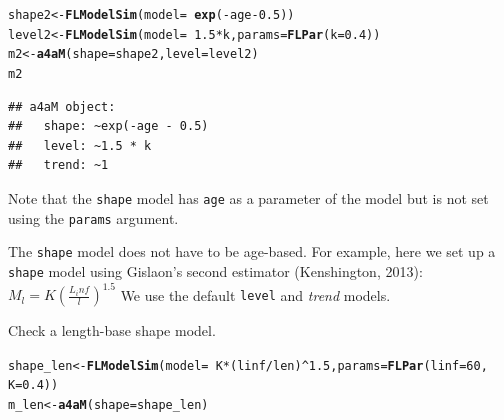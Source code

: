 \documentclass[a4paper,english,10pt]{article}\usepackage[]{graphicx}\usepackage[]{color}
\makeatletter
\newcommand{\hlnum}[1]{\textcolor[rgb]{0.686,0.059,0.569}{#1}}%
\newcommand{\hlopt}[1]{\textcolor[rgb]{0,0,0}{#1}}%
\newcommand{\hlstd}[1]{\textcolor[rgb]{0.345,0.345,0.345}{#1}}%
\newcommand{\hlkwb}[1]{\textcolor[rgb]{0.69,0.353,0.396}{#1}}%
\newcommand{\hlkwc}[1]{\textcolor[rgb]{0.333,0.667,0.333}{#1}}%
\newcommand{\hlkwd}[1]{\textcolor[rgb]{0.737,0.353,0.396}{\textbf{#1}}}%
\newenvironment{kframe}{%
 \def\at@end@of@kframe{}%
 \ifinner\ifhmode%
  \def\at@end@of@kframe{\end{minipage}}%
  \begin{minipage}{\columnwidth}%
 \fi\fi%
 \def\FrameCommand##1{\hskip\@totalleftmargin \hskip-\fboxsep
 \colorbox{shadecolor}{##1}\hskip-\fboxsep
     \hskip-\linewidth \hskip-\@totalleftmargin \hskip\columnwidth}%
 \MakeFramed {\advance\hsize-\width
   \@totalleftmargin\z@ \linewidth\hsize
   \@setminipage}}%
 {\par\unskip\endMakeFramed%
 \at@end@of@kframe}
\newenvironment{knitrout}{}{} %
\newcommand{\code}[1]{{\texttt{#1}}}
\newcommand{\class}[1]{{\textit{#1}}}
\makeatother
\begin{document}
\begin{knitrout}
\color{fgcolor}\begin{kframe}
\begin{alltt}
\hlstd{shape2} \hlkwb{<-} \hlkwd{FLModelSim}\hlstd{(}\hlkwc{model} \hlstd{=} \hlopt{~}\hlkwd{exp}\hlstd{(}\hlopt{-}\hlstd{age} \hlopt{-} \hlnum{0.5}\hlstd{))}
\hlstd{level2} \hlkwb{<-} \hlkwd{FLModelSim}\hlstd{(}\hlkwc{model} \hlstd{=} \hlopt{~}\hlnum{1.5} \hlopt{*} \hlstd{k,} \hlkwc{params} \hlstd{=} \hlkwd{FLPar}\hlstd{(}\hlkwc{k} \hlstd{=} \hlnum{0.4}\hlstd{))}
\hlstd{m2} \hlkwb{<-} \hlkwd{a4aM}\hlstd{(}\hlkwc{shape} \hlstd{= shape2,} \hlkwc{level} \hlstd{= level2)}
\hlstd{m2}
\end{alltt}
\begin{verbatim}
## a4aM object:
##   shape: ~exp(-age - 0.5)
##   level: ~1.5 * k
##   trend: ~1
\end{verbatim}
\end{kframe}
\end{knitrout}


Note that the \code{shape} model has \code{age} as a parameter of the model but is not set using the \code{params} argument.

The \code{shape} model does not have to be age-based. For example, here we set up a \code{shape} model using Gislaon's second estimator (Kenshington, 2013):
$M_l=K(\frac{L_inf}{l})^1.5$
We use the default \code{level} and \class{trend} models.

Check a length-base shape model.

\begin{knitrout}
\color{fgcolor}\begin{kframe}
\begin{alltt}
\hlstd{shape_len} \hlkwb{<-} \hlkwd{FLModelSim}\hlstd{(}\hlkwc{model} \hlstd{=} \hlopt{~}\hlstd{K} \hlopt{*} \hlstd{(linf}\hlopt{/}\hlstd{len)}\hlopt{^}\hlnum{1.5}\hlstd{,} \hlkwc{params} \hlstd{=} \hlkwd{FLPar}\hlstd{(}\hlkwc{linf} \hlstd{=} \hlnum{60}\hlstd{,}
    \hlkwc{K} \hlstd{=} \hlnum{0.4}\hlstd{))}
\hlstd{m_len} \hlkwb{<-} \hlkwd{a4aM}\hlstd{(}\hlkwc{shape} \hlstd{= shape_len)}
\end{alltt}
\end{kframe}
\end{knitrout}
\end{document}
